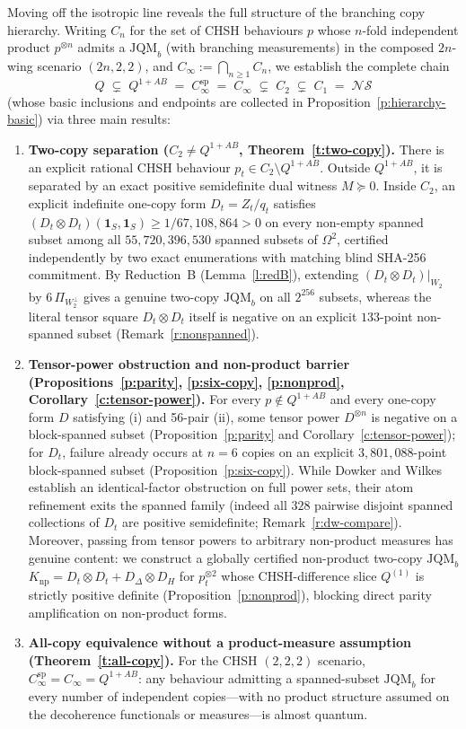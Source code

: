 \documentclass[11pt,a4paper]{article}
\theoremstyle{definition}
\theoremstyle{remark}
\newcommand{\ind}[1]{\mathbf{1}_{#1}}
\newcommand{\JQMb}{\mathrm{JQM}_b}
\newcommand{\QAB}{Q^{1+AB}}
\newcommand{\NS}{\mathcal{NS}}
\begin{document}
Moving off the isotropic line reveals the full structure of the branching copy hierarchy. Writing $C_n$ for the set of CHSH behaviours $p$ whose $n$-fold independent product $p^{\otimes n}$ admits a $\JQMb$ (with branching measurements) in the composed $2n$-wing scenario $(2n,2,2)$, and $C_\infty := \bigcap_{n \ge 1} C_n$, we establish the complete chain
\[
  Q \;\subsetneq\; \QAB \;=\; C_\infty^{\mathrm{sp}} \;=\; C_\infty \;\subsetneq\; C_2 \;\subsetneq\; C_1 \;=\; \NS
\]
(whose basic inclusions and endpoints are collected in Proposition~\ref{p:hierarchy-basic}) via three main results:
\begin{enumerate}
  \item \textbf{Two-copy separation ($C_2 \neq \QAB$, Theorem~\ref{t:two-copy}).} There is an explicit rational CHSH behaviour $p_t \in C_2 \setminus \QAB$. Outside $\QAB$, it is separated by an exact positive semidefinite dual witness $M \succeq 0$. Inside $C_2$, an explicit indefinite one-copy form $D_t = Z_t / q_t$ satisfies $(D_t \otimes D_t)(\ind S, \ind S) \ge 1/67{,}108{,}864 > 0$ on every non-empty spanned subset among all $55{,}720{,}396{,}530$ spanned subsets of $\Omega^2$, certified independently by two exact enumerations with matching blind SHA-256 commitment. By Reduction~B (Lemma~\ref{l:redB}), extending $(D_t \otimes D_t)|_{W_2}$ by $6\,\Pi_{W_2^\perp}$ gives a genuine two-copy $\JQMb$ on all $2^{256}$ subsets, whereas the literal tensor square $D_t \otimes D_t$ itself is negative on an explicit $133$-point non-spanned subset (Remark~\ref{r:nonspanned}).
  \item \textbf{Tensor-power obstruction and non-product barrier (Propositions~\ref{p:parity}, \ref{p:six-copy}, \ref{p:nonprod}, Corollary~\ref{c:tensor-power}).} For every $p \notin \QAB$ and every one-copy form $D$ satisfying (i) and 56-pair (ii), some tensor power $D^{\otimes n}$ is negative on a block-spanned subset (Proposition~\ref{p:parity} and Corollary~\ref{c:tensor-power}); for $D_t$, failure already occurs at $n = 6$ copies on an explicit $3{,}801{,}088$-point block-spanned subset (Proposition~\ref{p:six-copy}). While Dowker and Wilkes \cite[Lemma~12]{DW} establish an identical-factor obstruction on full power sets, their atom refinement exits the spanned family (indeed all $328$ pairwise disjoint spanned collections of $D_t$ are positive semidefinite; Remark~\ref{r:dw-compare}). Moreover, passing from tensor powers to arbitrary non-product measures has genuine content: we construct a globally certified non-product two-copy $\JQMb$ $K_{\mathrm{np}} = D_t \otimes D_t + D_\Delta \otimes D_H$ for $p_t^{\otimes 2}$ whose CHSH-difference slice $Q^{(1)}$ is strictly positive definite (Proposition~\ref{p:nonprod}), blocking direct parity amplification on non-product forms.
  \item \textbf{All-copy equivalence without a product-measure assumption (Theorem~\ref{t:all-copy}).} For the CHSH $(2,2,2)$ scenario, $C_\infty^{\mathrm{sp}} = C_\infty = \QAB$: any behaviour admitting a spanned-subset $\JQMb$ for every number of independent copies---with no product structure assumed on the decoherence functionals or measures---is almost quantum.
\end{enumerate}
\end{document}
